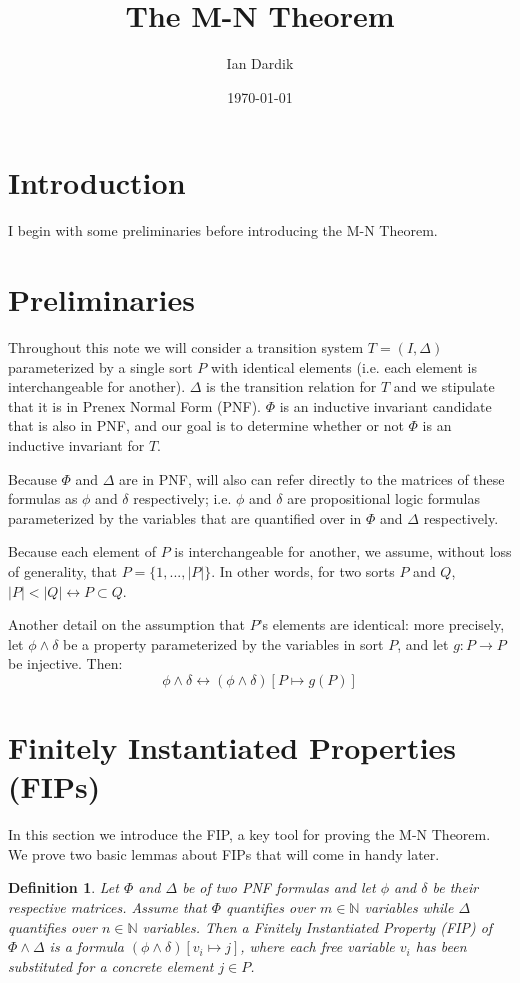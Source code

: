 \documentclass[12pt]{article}
\title{The M-N Theorem}
\author{Ian Dardik}
\date{\today}
\newtheorem{definition}{Definition}
\begin{document}
\maketitle

\section{Introduction}
I begin with some preliminaries before introducing the M-N Theorem.


\section{Preliminaries}
Throughout this note we will consider a transition system $T=(I,\Delta)$ parameterized by a single sort $P$ with identical elements (i.e. each element is interchangeable for another).  $\Delta$ is the transition relation for $T$ and we stipulate that it is in Prenex Normal Form (PNF).  $\Phi$ is an inductive invariant candidate that is also in PNF, and our goal is to determine whether or not $\Phi$ is an inductive invariant for $T$.

Because $\Phi$ and $\Delta$ are in PNF, will also can refer directly to the matrices of these formulas as $\phi$ and $\delta$ respectively; i.e. $\phi$ and $\delta$ are propositional logic formulas parameterized by the variables that are quantified over in $\Phi$ and $\Delta$ respectively.

Because each element of $P$ is interchangeable for another, we assume, without loss of generality, that $P = \{1,...,|P|\}$.  In other words, for two sorts $P$ and $Q$, $|P| < |Q| \leftrightarrow P \subset Q$.

Another detail on the assumption that $P$'s elements are identical: more precisely, let $\phi \land \delta$ be a property parameterized by the variables in sort $P$, and let $g : P \to P$ be injective.  Then:
$$\phi \land \delta \leftrightarrow (\phi \land \delta)[P \mapsto g(P)]$$


\section{Finitely Instantiated Properties (FIPs)}
In this section we introduce the FIP, a key tool for proving the M-N Theorem.  We prove two basic lemmas about FIPs that will come in handy later.

\begin{definition}
  Let $\Phi$ and $\Delta$ be of two PNF formulas and let $\phi$ and $\delta$ be their respective matrices.  Assume that $\Phi$ quantifies over $m \in \mathbb{N}$ variables while $\Delta$ quantifies over $n \in \mathbb{N}$ variables.  Then a Finitely Instantiated Property (FIP) of $\Phi \land \Delta$ is a formula $(\phi \land \delta) [v_i \mapsto j]$, where each free variable $v_i$ has been substituted for a concrete element $j \in P$.  
\end{definition}
\end{document}
